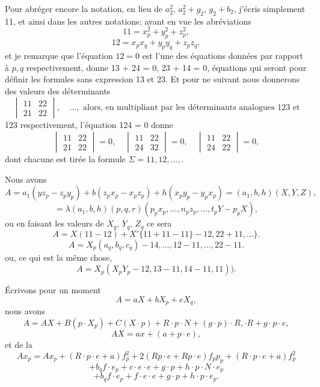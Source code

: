 \documentclass[11pt,a4paper]{book}
\begin{document}
Pour abr\'eger encore la notation, en lieu de $a^2_2$, $a^2_2 + g_2$, $g_2 + b_2$, j'\'ecris simplement
11, et ainsi dans les autres notations; ayant en vue les abr\'eviations
\[
11 = x^2_p + y^2_p + z^2_p,
\]
\[
12 = x_p x_q + y_p y_q + z_p z_q,
\]
et je remarque que l'\'equation $12 = 0$ est l'une des \'equations donn\'ees par rapport \`a $p, q$
respectivement, donne 13 + 24 = 0, 23 + 14 = 0, \'equations qui seront pour d\'efinir les
formules sans expression 13 et 23. Et pour ne suivant nous donnerons des valeurs des
d\'eterminants
\[
\begin{vmatrix}
11 & 22 \\
21 & 22
\end{vmatrix}, \quad \ldots, \text{ alors, en multipliant par les d\'eterminants analogues 123 et}
\]
123 respectivement, l'\'equation 124 = 0 donne
\[
\begin{vmatrix} 11 & 22 \\ 21 & 22 \end{vmatrix} = 0, \quad \begin{vmatrix} 11 & 22 \\ 24 & 32 \end{vmatrix} = 0, \quad \begin{vmatrix} 11 & 22 \\ 24 & 22 \end{vmatrix} = 0,
\]
dont chacune est tir\'ee la formule $\Sigma = 11, 12, \ldots,$.

Nous avons
\[
A = a_1 (yz_p - z_p y_p) + b(z_p x_p - x_p z_p) + h(x_p y_p - y_p x_p) = (a_1, b, h)(X, Y, Z),
\]
\[
= \lambda(a_1, b, h)(p, q, r)(p_p x_p, \ldots, n_p z_p, \ldots, t_p Y - p_p X),
\]
ou en faisant les valeurs de $X_q$, $Y_q$, $Z_q$ ce sera
\[
A = X(11 - 12) + X'\{11 + 11 - 11\} - 12, 22 + 11, \ldots\}.
\]
\[
A = X_p (a_q, b_q, c_q) - 14, \ldots, 12 - 11, \ldots, 22 - 11.
\]
ou, ce qui est la m\^eme chose,
\[
A = X_p(X_p Y_p - 12, 13 - 11, 14 - 11, 11)).
\]

\'Ecrivons pour un moment
\[
A = a X + b X_p + e X_q,
\]
nous avons
\[
A = AX + B(p \cdot X_p) + C(X \cdot p) + R \cdot p \cdot N + (g \cdot p) \cdot R, \cdot R + g \cdot p \cdot e,
\]
\[
A X = ax + (a + p \cdot e),
\]
et de la
\[
A x_p = A x_p + (R \cdot p \cdot e + a) f^2_p + 2(R p \cdot e + R p \cdot e) f_p p_p + (R \cdot p \cdot e + a) f^2_p
\]
\[
+ b_q f \cdot e_p + c \cdot e \cdot e + g \cdot p + h \cdot p \cdot N \cdot e_p
\]
\[
+ b_q f \cdot e_p + f \cdot e \cdot e + g \cdot p + h \cdot p \cdot e_p.
\]

\clearpage
\end{document}

